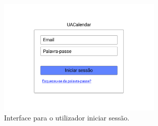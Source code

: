 \documentclass[11pt, twoside]{report}
\begin{document}
	\begin{figure}[H] 
		\centering 
		\includegraphics[width=0.7\textwidth,height=0.7\textheight,keepaspectratio]{image/prototipowireframes/autenticacao}
		\caption{Interface para o utilizador iniciar sessão.}
		\label{usecaseautenticacao}
	\end{figure}
\end{document}
